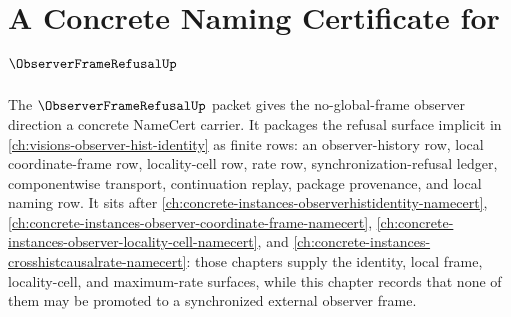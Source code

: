 \chapter{A Concrete Naming Certificate for $\ObserverFrameRefusalUp$}
\label{ch:concrete-instances-observerframerefusal-namecert}

The $\ObserverFrameRefusalUp$ packet gives the no-global-frame observer direction a concrete NameCert carrier. It packages the refusal surface implicit in \autoref{ch:visions-observer-hist-identity} as finite rows: an observer-history row, local coordinate-frame row, locality-cell row, rate row, synchronization-refusal ledger, componentwise transport, continuation replay, package provenance, and local naming row. It sits after \autoref{ch:concrete-instances-observerhistidentity-namecert}, \autoref{ch:concrete-instances-observer-coordinate-frame-namecert}, \autoref{ch:concrete-instances-observer-locality-cell-namecert}, and \autoref{ch:concrete-instances-crosshistcausalrate-namecert}: those chapters supply the identity, local frame, locality-cell, and maximum-rate surfaces, while this chapter records that none of them may be promoted to a synchronized external observer frame.

